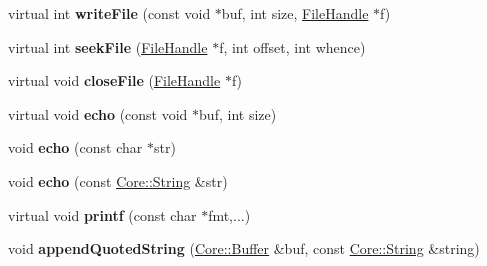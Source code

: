 \begin{DoxyCompactItemize}
\item 
virtual int {\bfseries write\+File} (const void $\ast$buf, int size, \hyperlink{struct_object_script_1_1_o_s_1_1_file_handle}{File\+Handle} $\ast$f)\hypertarget{class_object_script_1_1_o_s_aa938495a6fa5dc5010537e59fc2aa2d8}{}\label{class_object_script_1_1_o_s_aa938495a6fa5dc5010537e59fc2aa2d8}

\item 
virtual int {\bfseries seek\+File} (\hyperlink{struct_object_script_1_1_o_s_1_1_file_handle}{File\+Handle} $\ast$f, int offset, int whence)\hypertarget{class_object_script_1_1_o_s_a42920ca15e1d5654fc3f5ee5256a5284}{}\label{class_object_script_1_1_o_s_a42920ca15e1d5654fc3f5ee5256a5284}

\item 
virtual void {\bfseries close\+File} (\hyperlink{struct_object_script_1_1_o_s_1_1_file_handle}{File\+Handle} $\ast$f)\hypertarget{class_object_script_1_1_o_s_a807c56660bb94253394bb9b89aeb7b1b}{}\label{class_object_script_1_1_o_s_a807c56660bb94253394bb9b89aeb7b1b}

\item 
virtual void {\bfseries echo} (const void $\ast$buf, int size)\hypertarget{class_object_script_1_1_o_s_aace566bdbaba54f9eb67735c8a1643d1}{}\label{class_object_script_1_1_o_s_aace566bdbaba54f9eb67735c8a1643d1}

\item 
void {\bfseries echo} (const char $\ast$str)\hypertarget{class_object_script_1_1_o_s_a48d94223200ed7709df94d95a4561e24}{}\label{class_object_script_1_1_o_s_a48d94223200ed7709df94d95a4561e24}

\item 
void {\bfseries echo} (const \hyperlink{class_object_script_1_1_o_s_1_1_core_1_1_string}{Core\+::\+String} \&str)\hypertarget{class_object_script_1_1_o_s_a60489d9a5315404c263e7d84a0a85f0c}{}\label{class_object_script_1_1_o_s_a60489d9a5315404c263e7d84a0a85f0c}

\item 
virtual void {\bfseries printf} (const char $\ast$fmt,...)\hypertarget{class_object_script_1_1_o_s_af0ea32a5d9f4a3661badd20aa6d3f7af}{}\label{class_object_script_1_1_o_s_af0ea32a5d9f4a3661badd20aa6d3f7af}

\item 
void {\bfseries append\+Quoted\+String} (\hyperlink{class_object_script_1_1_o_s_1_1_core_1_1_buffer}{Core\+::\+Buffer} \&buf, const \hyperlink{class_object_script_1_1_o_s_1_1_core_1_1_string}{Core\+::\+String} \&string)\hypertarget{class_object_script_1_1_o_s_a56e0d271ee9821c1ac1617378dfadd7b}{}\label{class_object_script_1_1_o_s_a56e0d271ee9821c1ac1617378dfadd7b}


\end{DoxyCompactItemize}
